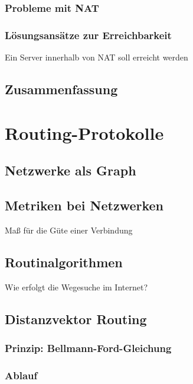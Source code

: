 \subsubsection{Probleme mit NAT}
\subsubsection{Lösungsansätze zur Erreichbarkeit}
Ein Server innerhalb von NAT soll erreicht werden
\subsection{Zusammenfassung}

\section{Routing-Protokolle}
\subsection{Netzwerke als Graph}

\subsection{Metriken bei Netzwerken}
Maß für die Güte einer Verbindung

\subsection{Routinalgorithmen}
Wie erfolgt die Wegesuche im Internet?

\subsection{Distanzvektor Routing}

\subsubsection{Prinzip: Bellmann-Ford-Gleichung}
\subsubsection{Ablauf}
